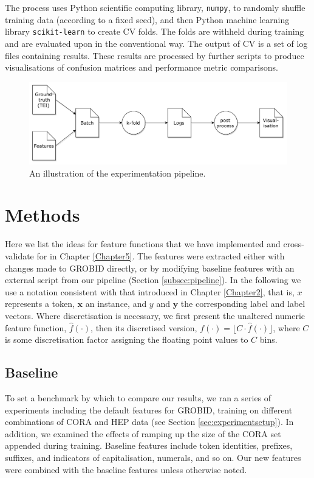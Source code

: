 The process uses Python scientific computing library, \texttt{numpy}, to randomly shuffle training data (according to a fixed seed), and then Python machine learning library \texttt{scikit-learn} to create CV folds. The folds are withheld during training and are evaluated upon in the conventional way. The output of CV is a set of log files containing results. These results are processed by further scripts to produce visualisations of confusion matrices and performance metric comparisons.

\begin{figure}[!ht]
\center
\includegraphics[width=\textwidth]{Figures/pipeline.pdf}
\caption{An illustration of the experimentation pipeline.}
\label{fig:pipeline}
\end{figure}

\section{Methods}
\label{sec:featurengineering}

Here we list the ideas for feature functions that we have implemented and cross-validate for in Chapter \ref{Chapter5}. The features were extracted either with changes made to GROBID directly, or by modifying baseline features with an external script from our pipeline (Section \ref{subsec:pipeline}). In the following we use a notation consistent with that introduced in Chapter \ref{Chapter2}, that is, $x$ represents a token, $\mathbf{x}$ an instance, and $y$ and $\textbf{y}$ the corresponding label and label vectors. Where discretisation is necessary, we first present the unaltered numeric feature function, $\hat f(\cdot)$, then its discretised version, $f(\cdot) = \lfloor C \cdot \hat f(\cdot)\rfloor$, where $C$ is some discretisation factor assigning the floating point values to $C$ bins.

\subsection{Baseline}

To set a benchmark by which to compare our results, we ran a series of experiments including the default features for GROBID, training on different combinations of CORA and HEP data (see Section \ref{sec:experimentsetup}). In addition, we examined the effects of ramping up the size of the CORA set appended during training. Baseline features include token identities, prefixes, suffixes, and indicators of capitalisation, numerals, and so on. Our new features were combined with the baseline features unless otherwise noted.

